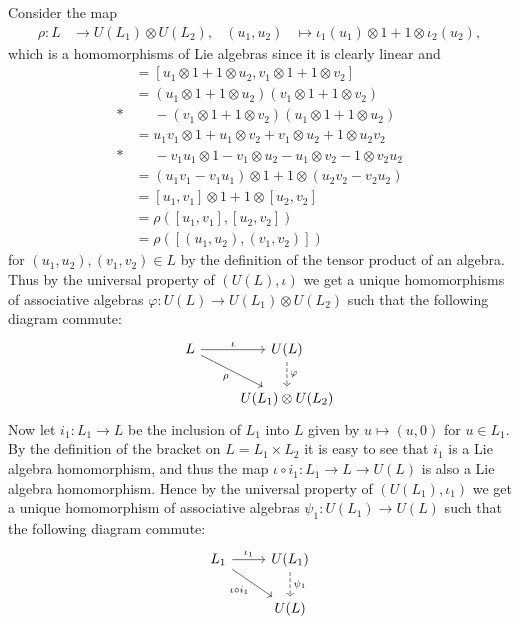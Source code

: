 Consider the map
\begin{align*}
  \rho\colon L &\to U(L_1)\otimes U(L_2), & (u_1,u_2)&\mapsto \iota_1(u_1)\otimes 1 + 1\otimes \iota_2(u_2),
\end{align*}
which is a homomorphisms of Lie algebras since it is clearly linear and
\begin{align*}
  [\rho(u_1,u_2),\rho(v_1,v_2)] &= [u_1\otimes 1 + 1\otimes u_2, v_1\otimes 1 + 1\otimes v_2] \\
                                &= (u_1\otimes 1+1\otimes u_2)(v_1\otimes 1 + 1\otimes v_2) \\*
                                &\phantom{{}={}}{} - (v_1\otimes 1 + 1\otimes v_2)(u_1\otimes 1 + 1\otimes u_2) \\
                                &= u_1v_1\otimes 1 + u_1\otimes v_2 + v_1\otimes u_2 + 1\otimes u_2v_2 \\*
                                &\phantom{{}={}}{} - v_1u_1\otimes 1 - v_1\otimes u_2 - u_1\otimes v_2 - 1\otimes v_2u_2 \\
                                &= (u_1v_1-v_1u_1)\otimes 1 + 1\otimes (u_2v_2-v_2u_2) \\
                                &= [u_1,v_1]\otimes 1 + 1\otimes [u_2,v_2] \\
                                &= \rho([u_1,v_1],[u_2,v_2]) \\
                                &= \rho([(u_1,u_2),(v_1,v_2)])
\end{align*}
for $(u_1,u_2),(v_1,v_2)\in L$ by the definition of the tensor product of an algebra. Thus by the universal property of $(U(L),\iota)$ we get a unique homomorphisms of associative algebras $\varphi\colon U(L)\to U(L_1)\otimes U(L_2)$ such that the following diagram commute:
\[
  \begin{tikzcd}
    L \ar[r,"\iota"]\ar[dr,"\rho",swap] & U(L)\ar[d,dashed,"\varphi"] \\
    & U(L_1)\otimes U(L_2)
  \end{tikzcd}
\]
Now let $i_1\colon L_1\to L$ be the inclusion of $L_1$ into $L$ given by $u\mapsto (u,0)$ for $u\in L_1$. By the definition of the bracket on $L=L_1\times L_2$ it is easy to see that $i_1$ is a Lie algebra homomorphism, and thus the map $\iota\circ i_1\colon L_1\to L\to U(L)$ is also a Lie algebra homomorphism. Hence by the universal property of $(U(L_1),\iota_1)$ we get a unique homomorphism of associative algebras $\psi_1\colon U(L_1)\to U(L)$ such that the following diagram commute:
\[
  \begin{tikzcd}
    L_1 \ar[r,"\iota_1"]\ar[dr,"\iota\circ i_1",swap] & U(L_1)\ar[d,dashed,"\psi_1"] \\
    & U(L)
  \end{tikzcd}
\]
